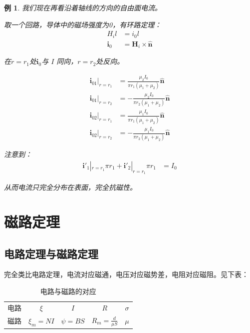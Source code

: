\documentclass[12pt,onecolumn,a4paper]{book}
\newtheorem*{example}{例}
\numberwithin{table}{subsection}
\numberwithin{equation}{subsection}
\begin{document}
\begin{example}
        我们现在再看沿着轴线的方向的自由面电流。

        取一个回路，导体中的磁场强度为0，有环路定理：
        \begin{align}
            H_i l        & = i_0 l                                 \\
            \mathbf{i}_0 & =  \mathbf{H}_i \times \hat{\mathbf{n}}
        \end{align}

        在$r=r_1$处$\mathbf{i}_0$与 $I$ 同向，$ r=r_2$处反向。

        \begin{align}
            \mathbf{i}_01|_{r=r_1} & = \frac{\mu_2 I_0}{\pi r_1 (\mu_1+\mu_2)} \hat{\mathbf{n}}  \\
            \mathbf{i}_01|_{r=r_2} & = -\frac{\mu_2 I_0}{\pi r_2 (\mu_1+\mu_2)} \hat{\mathbf{n}} \\
            \mathbf{i}_02|_{r=r_1} & = \frac{\mu_1 I_0}{\pi r_1 (\mu_1+\mu_2)} \hat{\mathbf{n}}  \\
            \mathbf{i}_02|_{r=r_2} & = -\frac{\mu_1 I_0}{\pi r_2 (\mu_1+\mu_2)} \hat{\mathbf{n}}
        \end{align}

        注意到：
        \begin{align}
            \mathbf{i'}_1|_{r=r_1} \pi r_1 + \mathbf{i'}_2|_{r=r_1} \pi r_1 & = I_0
        \end{align}

        从而电流只完全分布在表面，完全抗磁性。
    \end{example}

    \section{磁路定理}

    \subsection{电路定理与磁路定理}
    完全类比电路定理，电流对应磁通，电压对应磁势差，电阻对应磁阻。见下表：
    \begin{table}[ht]
        \centering
        \begin{tabular}{ccccc}
            \hline
            电路 & $\xi$        & $I$         & $R$                      & $\sigma$ \\
            磁路 & $\xi_m = NI$ & $\psi = BS$ & $R_m = \frac{ d}{\mu S}$ & $\mu$    \\ \hline
        \end{tabular}
        \caption{电路与磁路的对应}
    \end{table}
\end{document}
